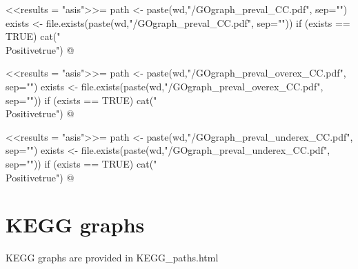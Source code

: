 \documentclass{article}
\begin{document}
\newif\ifPositive

<<results = "asis">>=
path <- paste(wd,"/GOgraph_preval_CC.pdf", sep="")
exists <- file.exists(paste(wd,"/GOgraph_preval_CC.pdf", sep=""))
if (exists == TRUE) {
  cat("\\Positivetrue")
}
@

\ifPositive
 \section{GO graphs of prevalent DEGs - Cellular Components (CC)}
  \subsection{General GOgraph from prevalent DEGs}
  This is the GO graph concerning the prevalent DEGs (Image extracted from {\bf"GOgraph\_preval\_CC.pdf"} file):
  \begin{center}
    \texttt{[image: \\Sexpr\{path]}}
  \end{center}
\fi



\newif\ifPositive

<<results = "asis">>=
path <- paste(wd,"/GOgraph_preval_overex_CC.pdf", sep="")
exists <- file.exists(paste(wd,"/GOgraph_preval_overex_CC.pdf", sep=""))
if (exists == TRUE) {
  cat("\\Positivetrue")
}
@

\ifPositive
  \subsection{GOgraphs showing overexpressed functions from prevalent DEGs}
  This is the GO graph concerning the overexpressed prevalent DEGs (Image extracted from {\bf"GOgraph\_preval\_overex\_CC.pdf"} file):
  \begin{center}
    \texttt{[image: \\Sexpr\{path]}}
  \end{center}
\fi


\newif\ifPositive

<<results = "asis">>=
path <- paste(wd,"/GOgraph_preval_underex_CC.pdf", sep="")
exists <- file.exists(paste(wd,"/GOgraph_preval_underex_CC.pdf", sep=""))
if (exists == TRUE) {
  cat("\\Positivetrue")
}
@

\ifPositive
  \subsection{GOgraphs showing underexpressed functions from prevalent DEGs}
  This is the GO graph concerning the underexpressed prevalent DEGs (Image extracted from {\bf"GOgraph\_preval\_underex\_CC.pdf"} file):
  \begin{center}
    \texttt{[image: \\Sexpr\{path]}}
  \end{center}
\fi


\section{KEGG graphs}

KEGG graphs are provided in KEGG\_paths.html 
\end{document}
